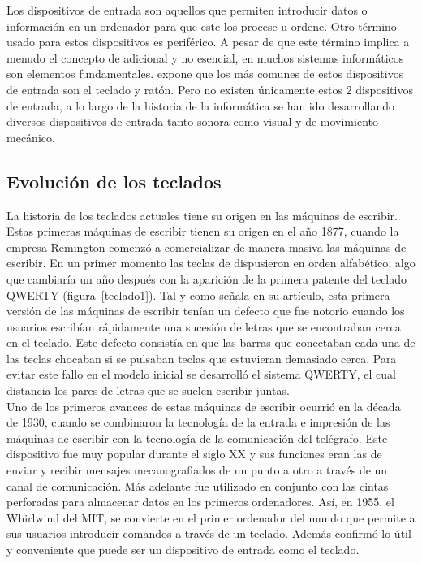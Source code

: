 Los dispositivos de entrada son aquellos que permiten introducir datos o informaci\'on en un ordenador para que este los procese u ordene. Otro t\'ermino usado para estos dispositivos es perif\'erico. A pesar de que este t\'ermino implica a menudo el concepto de adicional y no esencial, en muchos sistemas inform\'aticos son elementos fundamentales. \cite{entradasalida} expone que los m\'as comunes de estos dispositivos de entrada son el teclado y rat\'on. Pero no existen \'unicamente estos 2 dispositivos de entrada, a lo largo de la historia de la inform\'atica se han ido desarrollando diversos dispositivos de entrada tanto sonora como visual y de movimiento mec\'anico.\\



\subsection{Evoluci\'on de los teclados}

La historia de los teclados actuales tiene su origen en las m\'aquinas de escribir. Estas primeras m\'aquinas de escribir tienen su origen en el a\~no 1877, cuando la empresa Remington comenz\'o a comercializar de manera masiva las m\'aquinas de escribir. En un primer momento las teclas de dispusieron en orden alfab\'etico, algo que cambiar\'ia un a\~no despu\'es con la aparici\'on de la primera patente del teclado QWERTY (figura~\ref{teclado1}). Tal y como se\~nala \cite{jimmy} en su art\'iculo, esta primera versi\'on de las m\'aquinas de escribir ten\'ian un defecto que fue notorio cuando los usuarios escrib\'ian r\'apidamente una sucesi\'on de letras que se encontraban cerca en el teclado. Este defecto consist\'ia en que las barras que conectaban cada una de las teclas chocaban si se pulsaban teclas que estuvieran demasiado cerca.  Para evitar este fallo en el modelo inicial se desarroll\'o el sistema QWERTY, el cual distancia los pares de letras que se suelen escribir juntas.\\

Uno de los primeros avances de estas m\'aquinas de escribir ocurri\'o en la d\'ecada de 1930, cuando se combinaron la tecnolog\'ia de la entrada e impresi\'on de las m\'aquinas de escribir con la tecnolog\'ia de la comunicaci\'on del tel\'egrafo. Este dispositivo fue muy popular durante el siglo XX y sus funciones eran las de enviar y recibir mensajes mecanografiados de un punto a otro a trav\'es de un canal de comunicaci\'on. M\'as adelante fue utilizado en conjunto con las cintas perforadas para almacenar datos en los primeros ordenadores. As\'i, en 1955, el Whirlwind del MIT, se convierte en el primer ordenador del mundo que permite a sus usuarios introducir comandos a trav\'es de un teclado. Adem\'as confirm\'o lo \'util y conveniente que puede ser un dispositivo de entrada como el teclado.\\

